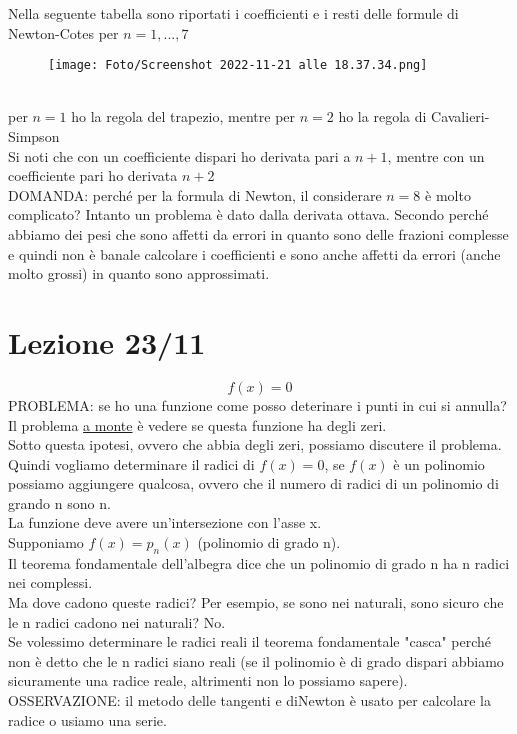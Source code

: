 \documentclass[a4paper, portrait]{book}
\numberwithin{equation}{chapter} %
\begin{document}
Nella seguente tabella sono riportati i coefficienti e i resti delle formule di Newton-Cotes per $n = 1,...,7$
\begin{figure}[h!]
    \centering
    \texttt{[image: Foto/Screenshot 2022-11-21 alle 18.37.34.png]}
    \caption{}
\end{figure}
\\per $n=1$ ho la regola del trapezio, mentre per $n=2$ ho la regola di Cavalieri-Simpson\\
Si noti che con un coefficiente dispari ho derivata pari a $n+1$, mentre con un coefficiente pari ho derivata $n+2$\\
DOMANDA: perché per la formula di Newton, il considerare $n=8$ è molto complicato? Intanto un problema è dato dalla derivata ottava. Secondo perché abbiamo dei pesi che sono affetti da errori in quanto sono delle frazioni complesse e quindi non è banale calcolare i coefficienti e sono anche affetti da errori (anche molto grossi) in quanto sono approssimati.
\chapter{Lezione 23/11}
\begin{equation}
    f(x) = 0
\end{equation}
PROBLEMA: se ho una funzione come posso deterinare i punti in cui si annulla? Il problema \underline{a monte} è vedere se questa funzione ha degli zeri.\\
Sotto questa ipotesi, ovvero che abbia degli zeri, possiamo discutere il problema.\\
Quindi vogliamo determinare il radici di $f(x) = 0$, se $f(x)$ è un polinomio possiamo aggiungere qualcosa, ovvero che il numero di radici di un polinomio di grando n sono n.\\
La funzione deve avere un'intersezione con l'asse x.\\
Supponiamo $f(x) = p_n(x)$ (polinomio di grado n).\\
Il teorema fondamentale dell'albegra dice che un polinomio di grado n ha n radici nei complessi.\\
Ma dove cadono queste radici? Per esempio, se sono nei naturali, sono sicuro che le n radici cadono nei naturali? No.\\
Se volessimo determinare le radici reali il teorema fondamentale "casca" perché non è detto che le n radici siano reali (se il polinomio è di grado dispari abbiamo sicuramente una radice reale, altrimenti non lo possiamo sapere).\\
OSSERVAZIONE: il metodo delle tangenti e diNewton è usato per calcolare la radice o usiamo una serie.\\
\newpage
\end{document}
